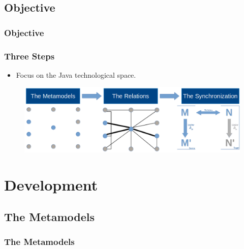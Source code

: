 \documentclass{beamer}
\begin{document}
\subsection{Objective}
\begin{frame}
	\frametitle{Objective}
\end{frame}

\begin{frame}[t]
	\frametitle{Three Steps}
	\begin{itemize}
		\item Focus on the Java technological space.
	\end{itemize}
	\pause
	\begin{figure}
		\vskip -5pt
		\includegraphics[scale=0.3]{objective}
	\end{figure}
\end{frame}

\section{Development} %
\subsection{The Metamodels}
\begin{frame}
	\frametitle{The Metamodels}
\end{frame}
\end{document}
